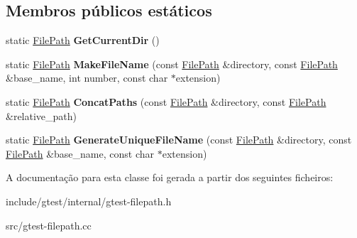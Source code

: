 \subsection*{Membros públicos estáticos}
\begin{DoxyCompactItemize}
\item 
\hypertarget{classtesting_1_1internal_1_1FilePath_aaff39ccd7bfb7a1c09c0220a64326387}{static \hyperlink{classtesting_1_1internal_1_1FilePath}{File\-Path} {\bfseries Get\-Current\-Dir} ()}\label{classtesting_1_1internal_1_1FilePath_aaff39ccd7bfb7a1c09c0220a64326387}

\item 
\hypertarget{classtesting_1_1internal_1_1FilePath_aa8c102da670261eb4fa8e2f2481df139}{static \hyperlink{classtesting_1_1internal_1_1FilePath}{File\-Path} {\bfseries Make\-File\-Name} (const \hyperlink{classtesting_1_1internal_1_1FilePath}{File\-Path} \&directory, const \hyperlink{classtesting_1_1internal_1_1FilePath}{File\-Path} \&base\-\_\-name, int number, const char $\ast$extension)}\label{classtesting_1_1internal_1_1FilePath_aa8c102da670261eb4fa8e2f2481df139}

\item 
\hypertarget{classtesting_1_1internal_1_1FilePath_ac9d57987f60ac43f0c57b89e333e531e}{static \hyperlink{classtesting_1_1internal_1_1FilePath}{File\-Path} {\bfseries Concat\-Paths} (const \hyperlink{classtesting_1_1internal_1_1FilePath}{File\-Path} \&directory, const \hyperlink{classtesting_1_1internal_1_1FilePath}{File\-Path} \&relative\-\_\-path)}\label{classtesting_1_1internal_1_1FilePath_ac9d57987f60ac43f0c57b89e333e531e}

\item 
\hypertarget{classtesting_1_1internal_1_1FilePath_a2280a77adb394cf80bb5f73fc292e8c8}{static \hyperlink{classtesting_1_1internal_1_1FilePath}{File\-Path} {\bfseries Generate\-Unique\-File\-Name} (const \hyperlink{classtesting_1_1internal_1_1FilePath}{File\-Path} \&directory, const \hyperlink{classtesting_1_1internal_1_1FilePath}{File\-Path} \&base\-\_\-name, const char $\ast$extension)}\label{classtesting_1_1internal_1_1FilePath_a2280a77adb394cf80bb5f73fc292e8c8}

\end{DoxyCompactItemize}


A documentação para esta classe foi gerada a partir dos seguintes ficheiros\-:\begin{DoxyCompactItemize}
\item 
include/gtest/internal/gtest-\/filepath.\-h\item 
src/gtest-\/filepath.\-cc\end{DoxyCompactItemize}
